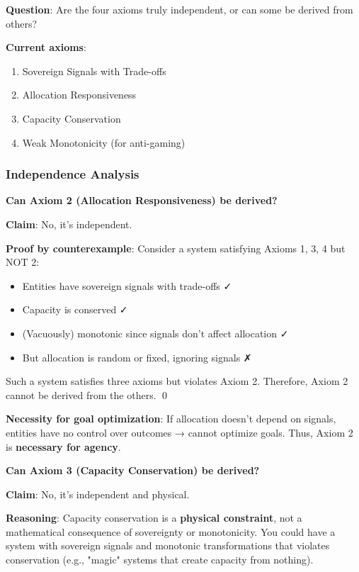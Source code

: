 \documentclass[11pt,a4paper]{article}
\theoremstyle{definition}
\theoremstyle{remark}
\begin{document}
\textbf{Question}: Are the four axioms truly independent, or can some be derived from others?

\textbf{Current axioms}:
\begin{enumerate}
\item Sovereign Signals with Trade-offs
\item Allocation Responsiveness
\item Capacity Conservation
\item Weak Monotonicity (for anti-gaming)
\end{enumerate}

\subsubsection{Independence Analysis}

\textbf{Can Axiom 2 (Allocation Responsiveness) be derived?}

\textbf{Claim}: No, it's independent.

\textbf{Proof by counterexample}: Consider a system satisfying Axioms 1, 3, 4 but NOT 2:
\begin{itemize}
\item Entities have sovereign signals with trade-offs ✓
\item Capacity is conserved ✓
\item (Vacuously) monotonic since signals don't affect allocation ✓
\item But allocation is random or fixed, ignoring signals ✗
\end{itemize}

Such a system satisfies three axioms but violates Axiom 2. Therefore, Axiom 2 cannot be derived from the others. \qed

\textbf{Necessity for goal optimization}: If allocation doesn't depend on signals, entities have no control over outcomes → cannot optimize goals. Thus, Axiom 2 is \textbf{necessary for agency}.

\medskip

\textbf{Can Axiom 3 (Capacity Conservation) be derived?}

\textbf{Claim}: No, it's independent and physical.

\textbf{Reasoning}: Capacity conservation is a \textbf{physical constraint}, not a mathematical consequence of sovereignty or monotonicity. You could have a system with sovereign signals and monotonic transformations that violates conservation (e.g., "magic" systems that create capacity from nothing).
\end{document}
